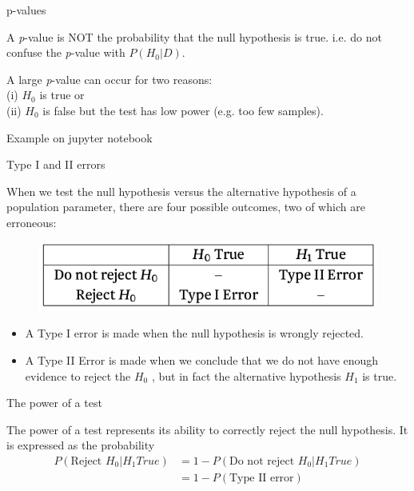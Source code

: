 \documentclass{beamer}
\begin{document}
\begin{frame}{p-values}

	A \textit{p}-value is NOT the probability that the null hypothesis is true. i.e. do not confuse
	the \textit{p}-value with $P(H_0 |D)$.

	\vskip 1cm

	A large \textit{p}-value can occur for two reasons:\\ 
	(i) $H_0$ is true or \\
	(ii) $H_0$ is false but the test has low power (e.g. too few samples).

	\vskip 0.5cm
	\tiny{Example on jupyter notebook}

\end{frame}

\begin{frame}{Type I and II errors}

	When we test the null hypothesis versus the alternative hypothesis of a
	population parameter, there are four possible outcomes, two of which
	are erroneous:

	\begin{figure}
		\includegraphics[width=0.6\linewidth]{type.png}
	\end{figure}

	\begin{itemize}
		\item A Type I error is made when the null hypothesis is wrongly rejected.
		\item A Type II Error is made when we conclude that we do not have enough
evidence to reject the $H_0$ , but in fact the alternative hypothesis $H_1$ is true.
	\end{itemize}

\end{frame}

\begin{frame}{The power of a test}

	The power of a test represents its ability to correctly reject the null
	hypothesis. It is expressed as the probability
	\begin{align*}
		P(\text{Reject }H_0 | H_1 True) &= 1 - P(\text{Do not reject }H_0 | H_1 True) \\
					&= 1 - P(\text{Type II error}) 
	\end{align*}

\end{frame}
\end{document}
